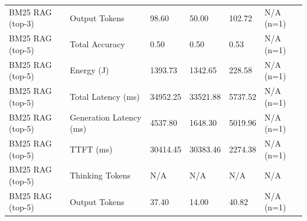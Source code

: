 \begin{table}
\begin{tabular}{llllll}
BM25 RAG (top-3) & Output Tokens & 98.60 & 50.00 & 102.72 & N/A (n=1) \\
BM25 RAG (top-5) & Total Accuracy & 0.50 & 0.50 & 0.53 & N/A (n=1) \\
BM25 RAG (top-5) & Energy (J) & 1393.73 & 1342.65 & 228.58 & N/A (n=1) \\
BM25 RAG (top-5) & Total Latency (ms) & 34952.25 & 33521.88 & 5737.52 & N/A (n=1) \\
BM25 RAG (top-5) & Generation Latency (ms) & 4537.80 & 1648.30 & 5019.96 & N/A (n=1) \\
BM25 RAG (top-5) & TTFT (ms) & 30414.45 & 30383.46 & 2274.38 & N/A (n=1) \\
BM25 RAG (top-5) & Thinking Tokens & N/A & N/A & N/A & N/A \\
BM25 RAG (top-5) & Output Tokens & 37.40 & 14.00 & 40.82 & N/A (n=1) \\
\bottomrule
\end{tabular}
\end{table}
